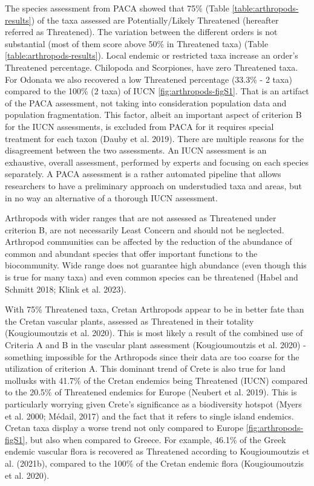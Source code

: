 The species assessment from PACA showed that 75\% (Table \ref{table:arthropods-results}) of the
taxa assessed are Potentially/Likely Threatened (hereafter referred as Threatened).
The variation between the different orders is not substantial (most of them
score above 50\% in Threatened taxa) (Table \ref{table:arthropods-results}). Local endemic or restricted taxa
increase an order’s Threatened percentage. Chilopoda and Scorpiones, have zero
Threatened taxa. For Odonata we also recovered a low Threatened percentage
(33.3\% - 2 taxa) compared to the 100\% (2 taxa) of IUCN
\ref{fig:arthropods-figS1}. That is an artifact of the PACA
assessment, not taking into consideration population data and population
fragmentation. This factor, albeit an important aspect of criterion B for the
IUCN assessments, is excluded from PACA for it requires special treatment for
each taxon (Dauby et al. 2019). There are multiple reasons for the disagreement
between the two assessments. An IUCN assessment is an exhaustive, overall
assessment, performed by experts and focusing on each species separately.
A PACA assessment is a rather automated pipeline that allows researchers to
have a preliminary approach on understudied taxa and areas, but in no way an
alternative of a thorough IUCN assessment.

Arthropods with wider ranges that are not assessed as Threatened under
criterion B, are not necessarily Least Concern and should not be neglected.
Arthropod communities can be affected by the reduction of the abundance of
common and abundant species that offer important functions to the biocommunity.
Wide range does not guarantee high abundance (even though this is true for many
taxa) and even common species can be threatened (Habel and Schmitt 2018; Klink et al. 2023).

With 75\% Threatened taxa, Cretan Arthropods appear to be in better fate than
the Cretan vascular plants, assessed as Threatened in their totality
(Kougioumoutzis et al. 2020). This is most likely a result of the combined use
of Criteria A and B in the vascular plant assessment (Kougioumoutzis et al. 2020) -
something impossible for the Arthropods since their data are too coarse for the
utilization of criterion A. This dominant trend of Crete is also true for land
mollusks with 41.7\% of the Cretan endemics being Threatened (IUCN) compared to
the 20.5\% of Threatened endemics for Europe (Neubert et al. 2019). This is
particularly worrying given Crete’s significance as a biodiversity
hotspot (Myers et al. 2000; Médail, 2017) and the fact that it refers to single
island endemics. Cretan taxa display a worse trend not only compared to Europe \ref{fig:arthropods-figS1},
but also when compared to Greece. For example, 46.1\% of the Greek endemic
vascular flora is recovered as Threatened according to Kougioumoutzis et al. (2021b),
compared to the 100\% of the Cretan endemic flora (Kougioumoutzis et al. 2020). 
    
